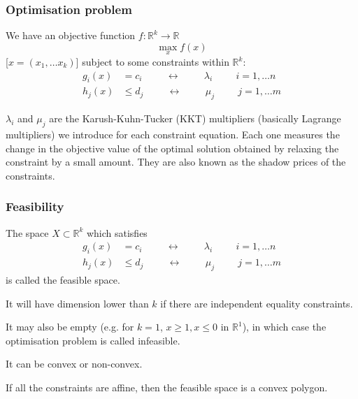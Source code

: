 \documentclass[10pt,aspectratio=169,dvipsnames]{beamer}
\newcommand{\R}{\mathbb{R}}
\def\l{\lambda}
\def\m{\mu}
\begin{document}
\begin{frame}
  \frametitle{Optimisation problem}


We have an \alert{objective function} $f: \R^k \to \R$
\begin{equation*}
  \max_{x} f(x)
\end{equation*}
[$x = (x_1, \dots x_k)$] subject to some \alert{constraints} within $\R^k$:
\begin{align*}
  g_i(x) & = c_i \hspace{1cm}\leftrightarrow\hspace{1cm} \l_i \hspace{1cm} i = 1,\dots n \\
  h_j(x) & \leq d_j \hspace{1cm}\leftrightarrow\hspace{1cm} \m_j \hspace{1cm} j = 1,\dots m
\end{align*}

$\l_i$ and $\m_j$ are the \alert{Karush-Kuhn-Tucker (KKT) multipliers} (basically Lagrange multipliers) we introduce for
each constraint equation. Each one measures the change in the objective value of the optimal solution obtained by relaxing the constraint by a small amount. They are also known as the \alert{shadow prices} of the constraints.

\end{frame}


\begin{frame}
  \frametitle{Feasibility}

  The space $X \subset \R^k$ which satisfies
\begin{align*}
  g_i(x) & = c_i \hspace{1cm}\leftrightarrow\hspace{1cm} \l_i \hspace{1cm} i = 1,\dots n \\
  h_j(x) & \leq d_j \hspace{1cm}\leftrightarrow\hspace{1cm} \m_j \hspace{1cm} j = 1,\dots m
\end{align*}
is called the \alert{feasible space}.

It will have dimension lower than $k$ if there are independent
equality constraints.

It may also be empty (e.g. for $k=1$, $x \geq 1, x \leq 0$ in $\R^1$), in which
case the optimisation problem is called \alert{infeasible}.

It can be \alert{convex} or \alert{non-convex}.

If all the constraints are affine, then the feasible space is a convex polygon.


\end{frame}
\end{document}
